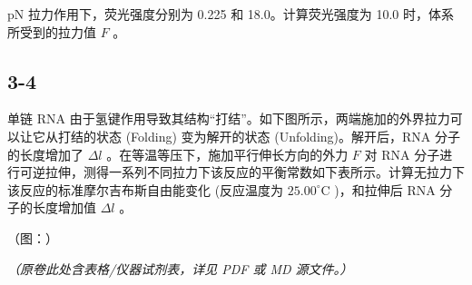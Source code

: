pN 拉力作用下，荧光强度分别为 0.225 和 18.0。计算荧光强度为 10.0 时，体系所受到的拉力值 $F$ 。

\subsection*{3-4}
单链 RNA 由于氢键作用导致其结构“打结”。如下图所示，两端施加的外界拉力可以让它从打结的状态 (Folding) 变为解开的状态 (Unfolding)。解开后，RNA 分子的长度增加了 $\Delta l$ 。在等温等压下，施加平行伸长方向的外力 $F$ 对 RNA 分子进行可逆拉伸，测得一系列不同拉力下该反应的平衡常数如下表所示。计算无拉力下该反应的标准摩尔吉布斯自由能变化 (反应温度为 $25.00^{\circ} \mathrm{C}$ )，和拉伸后 RNA 分子的长度增加值 $\Delta l$ 。

（图：）

\textit{（原卷此处含表格/仪器试剂表，详见 PDF 或 MD 源文件。）}
